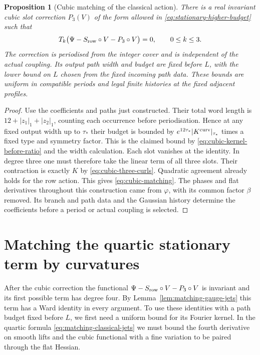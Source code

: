 \documentclass[11pt,reqno]{amsart}
\numberwithin{equation}{section}
\newtheorem{proposition}[theorem]{Proposition}
\theoremstyle{definition}
\theoremstyle{remark}
\begin{document}
\begin{proposition}[Cubic matching of the classical action]
\label{prop:cubic-curvature-matching}
There is a real invariant cubic slot correction \(P_3(V)\)
of the form allowed in \eqref{eq:stationary-higher-budget}
such that
\begin{equation}
 T_k\bigl(\Psi-S_{\rm row}\circ V-P_3\circ V\bigr)=0,
                            \qquad 0\le k\le3 .
 \label{eq:cubic-matching}
\end{equation}
The correction is periodised from the integer cover
and is independent of the actual coupling. Its output
path width and budget are fixed before \(L\), with the
lower bound on \(L\) chosen from the fixed incoming path
data. These bounds are uniform in compatible periods and
legal finite histories at the fixed adjacent profiles.
\end{proposition}
\begin{proof}
Use the coefficients and paths just constructed.
Their total word length is \(12+|z_1|_1+|z_2|_1\),
counting each occurrence before periodisation. Hence at
any fixed output width up to \(\tau_*\) their budget
is bounded by \(e^{12\tau_*}|K^{\rm curv}|_{\tau_*}\)
times a fixed type and symmetry factor. This is the
claimed bound by \eqref{eq:cubic-kernel-before-ratio}
and the width calculation. Each slot vanishes at the
identity. In degree three one must therefore take
the linear term of all three slots. Their contraction
is exactly \(K\) by \eqref{eq:cubic-three-curls}.
Quadratic agreement already holds for the row action.
This gives \eqref{eq:cubic-matching}. The phases and
flat derivatives throughout this construction came
from \(\varphi\), with its common factor \(\beta\)
removed. Its branch and path data and the Gaussian
history determine the coefficients before a period
or actual coupling is selected.
\end{proof}

\section{Matching the quartic stationary term by curvatures}
\label{sec:quartic-curvature-matching}

After the cubic correction the functional
\(\Psi-S_{\rm row}\circ V-P_3\circ V\) is invariant and its
first possible term has degree four. By
Lemma~\ref{lem:matching-gauge-jets} this term has a Ward identity
in every argument. To use these identities with a path budget
fixed before \(L\), we first need a uniform bound for its
Fourier kernel. In the quartic formula
\eqref{eq:matching-classical-jets} we must bound the
fourth derivative on smooth lifts and the cubic functional
with a fine variation to be paired through the flat Hessian.
\end{document}
